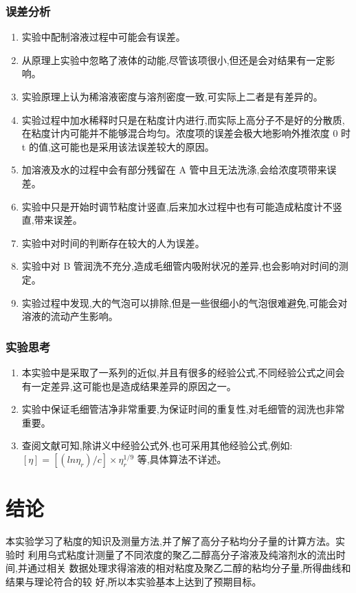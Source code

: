 \documentclass[11pt]{report}
\begin{document}
\section{误差分析}
\label{sec:org2dccffb}
\begin{enumerate}
\item 实验中配制溶液过程中可能会有误差。
\item 从原理上实验中忽略了液体的动能,尽管该项很小,但还是会对结果有一定影响。
\item 实验原理上认为稀溶液密度与溶剂密度一致,可实际上二者是有差异的。
\item 实验过程中加水稀释时只是在粘度计内进行,而实际上高分子不是好的分散质,在粘度计内可能并不能够混合均匀。浓度项的误差会极大地影响外推浓度 0 时 t 的值,这可能也是采用该法误差较大的原因。
\item 加溶液及水的过程中会有部分残留在 A 管中且无法洗涤,会给浓度项带来误差。
\item 实验中只是开始时调节粘度计竖直,后来加水过程中也有可能造成粘度计不竖直,带来误差。
\item 实验中对时间的判断存在较大的人为误差。
\item 实验中对 B 管润洗不充分,造成毛细管内吸附状况的差异,也会影响对时间的测定。
\item 实验过程中发现,大的气泡可以排除,但是一些很细小的气泡很难避免,可能会对溶液的流动产生影响。
\end{enumerate}

\section{实验思考}
\label{sec:org9ab5168}
\begin{enumerate}
\item 本实验中是采取了一系列的近似,并且有很多的经验公式,不同经验公式之间会有一定差异,这可能也是造成结果差异的原因之一。
\item 实验中保证毛细管洁净非常重要,为保证时间的重复性,对毛细管的润洗也非常重要。
\item 查阅文献可知,除讲义中经验公式外,也可采用其他经验公式,例如:\([\eta]=[(ln\eta_{r})/c]\times \eta_{r}^{1/9}\) 等,具体算法不详述。
\end{enumerate}

\part{结论}
\label{sec:org84f9a52}
  本实验学习了粘度的知识及测量方法,并了解了高分子粘均分子量的计算方法。实验时
利用乌式粘度计测量了不同浓度的聚乙二醇高分子溶液及纯溶剂水的流出时间,并通过相关
数据处理求得溶液的相对粘度及聚乙二醇的粘均分子量,所得曲线和结果与理论符合的较
好,所以本实验基本上达到了预期目标。
\end{document}
